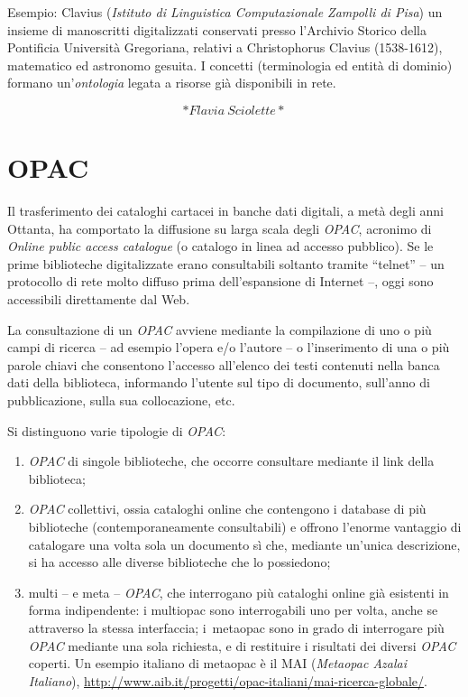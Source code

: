 \documentclass[
  b5paper,
  twoside,
  12pt,
  chapterprefix=false,
  bibliography=totocnumbered,
  parskip=false]{scrbook}
\begin{document}
Esempio: Clavius (\emph{Istituto di Linguistica Computazionale Zampolli di
Pisa}) un insieme di manoscritti digitalizzati conservati presso
l'Archivio Storico della Pontificia Università Gregoriana, relativi a
Christophorus Clavius (1538-1612), matematico ed astronomo gesuita. I
concetti (terminologia ed entità di dominio) formano un'\emph{ontologia}
legata a risorse già disponibili in rete.

\[*Flavia~Sciolette*\]

\hypertarget{opac}{%
\chapter{OPAC}\label{opac}}

Il trasferimento dei cataloghi cartacei in banche dati digitali, a metà
degli anni Ottanta, ha comportato la diffusione su larga scala degli
\emph{OPAC}, acronimo di \emph{Online public access catalogue} (o catalogo in
linea ad accesso pubblico). Se le prime biblioteche digitalizzate erano
consultabili soltanto tramite \enquote{telnet} -- un protocollo di rete molto
diffuso prima dell'espansione di Internet --, oggi sono accessibili
direttamente dal Web.

La consultazione di un \emph{OPAC} avviene mediante la compilazione di uno o
più campi di ricerca -- ad esempio l'opera e/o l'autore -- o
l'inserimento di una o più parole chiavi che consentono l'accesso
all'elenco dei testi contenuti nella banca dati della biblioteca,
informando l'utente sul tipo di documento, sull'anno di pubblicazione,
sulla sua collocazione, etc.

Si distinguono varie tipologie di \emph{OPAC}:

\begin{enumerate}
\def\labelenumi{\arabic{enumi}.}
\item
  \emph{OPAC} di singole biblioteche, che occorre consultare mediante il
  link della biblioteca;
\item
  \emph{OPAC} collettivi, ossia cataloghi online che contengono i database
  di più biblioteche (contemporaneamente consultabili) e offrono
  l'enorme vantaggio di catalogare una volta sola un documento sì che,
  mediante un'unica descrizione, si ha accesso alle diverse
  biblioteche che lo possiedono;
\item
  multi -- e meta -- \emph{OPAC}, che interrogano più cataloghi online già
  esistenti in forma indipendente: i multiopac sono interrogabili uno
  per volta, anche se attraverso la stessa interfaccia; i~metaopac
  sono in grado di interrogare più \emph{OPAC} mediante una sola richiesta,
  e di restituire i risultati dei diversi \emph{OPAC} coperti. Un esempio
  italiano di metaopac è il MAI (\emph{Metaopac Azalai Italiano}),
  \href{http://www.aib.it/progetti/opac-italiani/mai-ricerca-globale/}{{http://www.aib.it/progetti/opac-italiani/mai-ricerca-globale/}}.
\end{enumerate}
\end{document}
